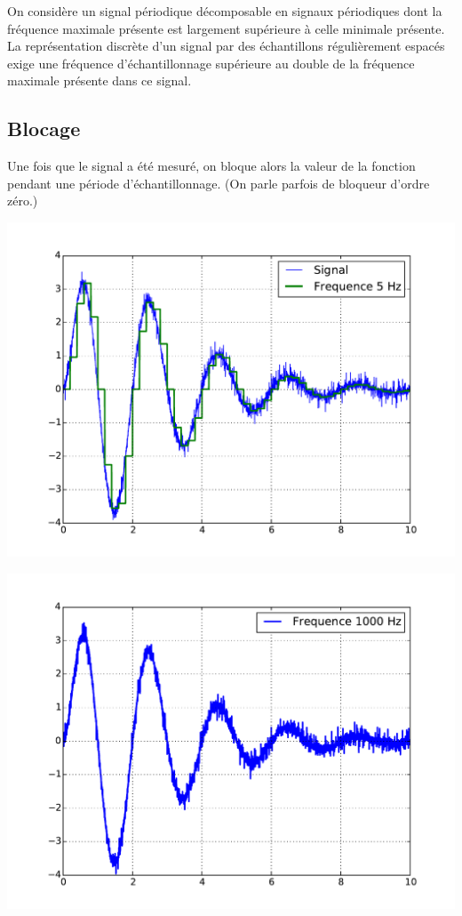 \documentclass[10pt,fleqn]{article} %
\begin{document}
\begin{theorem}
On considère un signal périodique décomposable en signaux périodiques dont la fréquence maximale présente est largement supérieure à celle minimale présente.
La représentation discrète d’un signal par des échantillons régulièrement espacés exige une fréquence d’échantillonnage supérieure au double de la fréquence maximale présente dans ce signal.
\end{theorem}


\subsection{Blocage}
Une fois que le signal a été mesuré, on bloque alors la valeur de la fonction pendant une période d'échantillonnage. (On parle parfois de bloqueur d'ordre zéro.)


\begin{minipage}[c]{.43\linewidth}
\begin{center}
\includegraphics[width=\textwidth]{images/bloc_1}
\end{center}
\end{minipage} \hfill
\begin{minipage}[c]{.43\linewidth}
\begin{center}
\includegraphics[width=\textwidth]{images/bloc_2}
\end{center}
\end{minipage} \hfill
\end{document}
